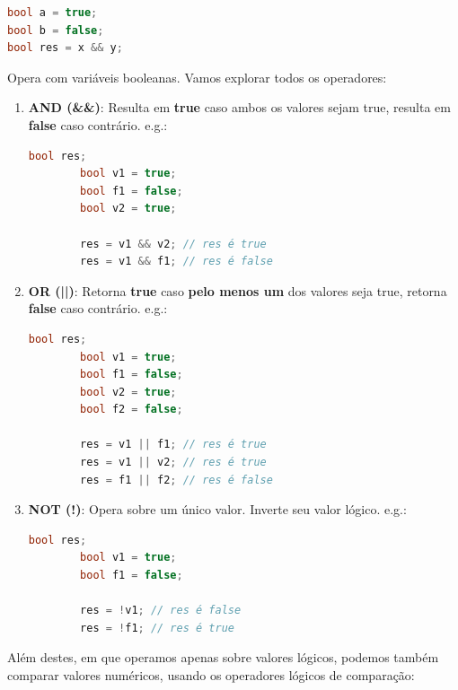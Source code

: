 \documentclass[12pt]{article}
\begin{document}
\begin{lstlisting}[language=C++]
bool a = true;
bool b = false;
bool res = x && y;

\end{lstlisting}
Opera com variáveis booleanas. Vamos explorar todos os operadores:
\begin{enumerate}
    \item \textbf{AND (\&\&)}: Resulta em \textbf{true} caso ambos os valores sejam true, resulta em \textbf{false} caso contrário. e.g.:
    \begin{lstlisting}[language=C++]
        bool res;
        bool v1 = true;
        bool f1 = false;
        bool v2 = true;
        
        res = v1 && v2; // res é true
        res = v1 && f1; // res é false
    \end{lstlisting}
    \item \textbf{OR (||)}: Retorna \textbf{true} caso \textbf{pelo menos um} dos valores seja true, retorna \textbf{false} caso contrário. e.g.:
    \begin{lstlisting}[language=C++]
        bool res;
        bool v1 = true;
        bool f1 = false;
        bool v2 = true;
        bool f2 = false;
        
        res = v1 || f1; // res é true
        res = v1 || v2; // res é true
        res = f1 || f2; // res é false
    \end{lstlisting}
    \item \textbf{NOT (!)}: Opera sobre um único valor. Inverte seu valor lógico. e.g.:
    \begin{lstlisting}[language=C++]
        bool res;
        bool v1 = true;
        bool f1 = false;

        res = !v1; // res é false
        res = !f1; // res é true
    \end{lstlisting}
\end{enumerate}
Além destes, em que operamos apenas sobre valores lógicos, podemos também comparar valores numéricos, usando os operadores lógicos de comparação:
\end{document}
